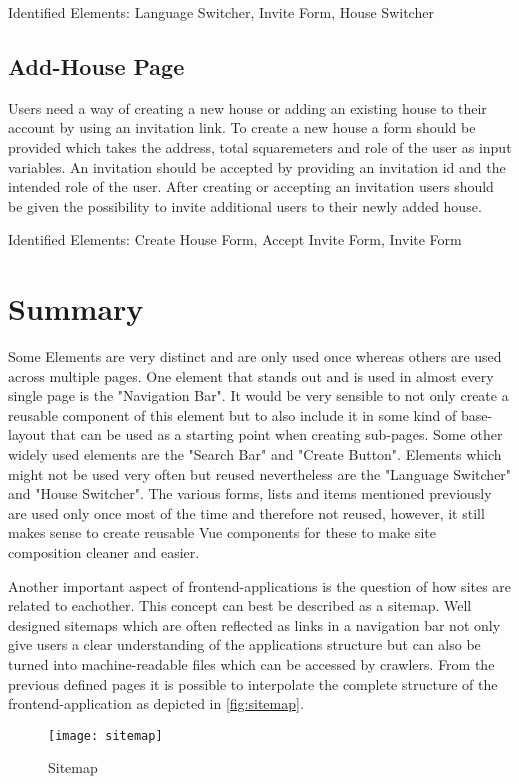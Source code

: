 Identified Elements: Language Switcher, Invite Form, House Switcher

\subsection{Add-House Page}
Users need a way of creating a new house or adding an existing house to their account by using an invitation link. To create a new house a form should be provided which takes the address, total squaremeters and role of the user as input variables. An invitation should be accepted by providing an invitation id and the intended role of the user. After creating or accepting an invitation users should be given the possibility to invite additional users to their newly added house. \newline

Identified Elements: Create House Form, Accept Invite Form, Invite Form

\section{Summary}
Some Elements are very distinct and are only used once whereas others are used across multiple pages. One element that stands out and is used in almost every single page is the "Navigation Bar". It would be very sensible to not only create a reusable component of this element but to also include it in some kind of base-layout that can be used as a starting point when creating sub-pages. Some other widely used elements are the "Search Bar" and "Create Button". Elements which might not be used very often but reused nevertheless are the "Language Switcher" and "House Switcher". The various forms, lists and items mentioned previously are used only once most of the time and therefore not reused, however, it still makes sense to create reusable Vue components for these to make site composition cleaner and easier.

Another important aspect of frontend-applications is the question of how sites are related to eachother. This concept can best be described as a sitemap. Well designed sitemaps which are often reflected as links in a navigation bar not only give users a clear understanding of the applications structure but can also be turned into machine-readable files which can be accessed by crawlers. From the previous defined pages it is possible to interpolate the complete structure of the frontend-application as depicted in \autoref{fig:sitemap}. \newline

\begin{figure}[H]
    \begin{center}
    \texttt{[image: sitemap]}
    \end{center}
    \caption{Sitemap}
    \label{fig:sitemap}
\end{figure}